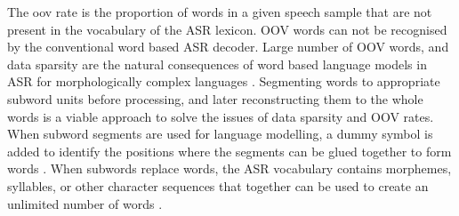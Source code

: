 The \gls{oov} rate is the proportion of words in a given speech
sample that are not present in the vocabulary of the ASR lexicon. OOV words can
not be recognised by the conventional word based ASR decoder. Large number of OOV words, and data sparsity
are the natural consequences of word based language models in ASR for
morphologically complex languages \cite{SMIT2021101158}. Segmenting words to appropriate subword
units before processing, and later reconstructing them to the whole words is a
viable approach to solve the issues of data sparsity and OOV rates. When
subword segments are used for language modelling, a dummy symbol is added to
identify the positions where the segments can be glued together to form words
\cite{smit17_interspeech}. When subwords replace words, the ASR vocabulary
contains morphemes, syllables, or other character sequences that together can
be used to create an unlimited number of words
\cite{creutz2007morph,sreeja-hybrid-2022}.



